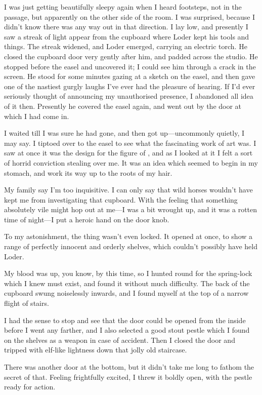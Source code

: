 I was just getting beautifully sleepy again when I heard footsteps, not in the passage, but apparently on the other side of the room. I was surprised, because I didn't know there was any way out in that direction. I lay low, and presently I saw a streak of light appear from the cupboard where Loder kept his tools and things. The streak widened, and Loder emerged, carrying an electric torch. He closed the cupboard door very gently after him, and padded across the studio. He stopped before the easel and uncovered it; I could see him through a crack in the screen. He stood for some minutes gazing at a sketch on the easel, and then gave one of the nastiest gurgly laughs I've ever had the pleasure of hearing. If I'd ever seriously thought of announcing my unauthorised presence, I abandoned all idea of it then. Presently he covered the easel again, and went out by the door at which I had come in.

I waited till I was sure he had gone, and then got up—uncommonly quietly, I may say. I tiptoed over to the easel to see what the fascinating work of art was. I saw at once it was the design for the figure of , and as I looked at it I felt a sort of horrid conviction stealing over me. It was an idea which seemed to begin in my stomach, and work its way up to the roots of my hair.

My family say I'm too inquisitive. I can only say that wild horses wouldn't have kept me from investigating that cupboard. With the feeling that something absolutely vile might hop out at me—I was a bit wrought up, and it was a rotten time of night—I put a heroic hand on the door knob.

To my astonishment, the thing wasn't even locked. It opened at once, to show a range of perfectly innocent and orderly shelves, which couldn't possibly have held Loder.

My blood was up, you know, by this time, so I hunted round for the spring-lock which I knew must exist, and found it without much difficulty. The back of the cupboard swung noiselessly inwards, and I found myself at the top of a narrow flight of stairs.

I had the sense to stop and see that the door could be opened from the inside before I went any farther, and I also selected a good stout pestle which I found on the shelves as a weapon in case of accident. Then I closed the door and tripped with elf-like lightness down that jolly old staircase.

There was another door at the bottom, but it didn't take me long to fathom the secret of that. Feeling frightfully excited, I threw it boldly open, with the pestle ready for action.


